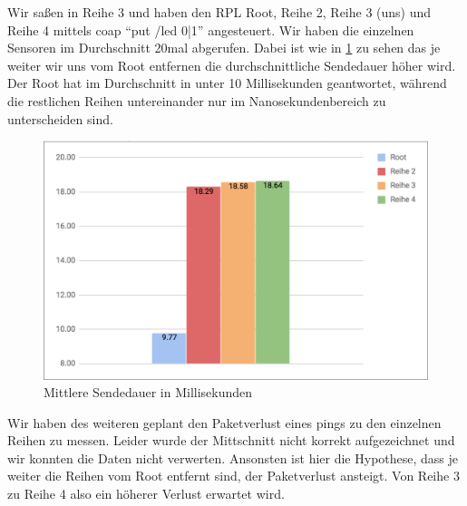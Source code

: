 \documentclass[paper=a4, fontsize=11pt]{scrartcl} %
\numberwithin{equation}{section} %
\numberwithin{figure}{section} %
\numberwithin{table}{section} %
\begin{document}
Wir saßen in Reihe 3 und haben den RPL Root, Reihe 2, Reihe 3 (uns) und Reihe 4 mittels coap ``put /led 0|1'' angesteuert. Wir haben die einzelnen Sensoren im Durchschnitt 20mal abgerufen. Dabei ist wie in \ref{fig:sendedauer} zu sehen das je weiter wir uns vom Root entfernen die durchschnittliche Sendedauer höher wird. Der Root hat im Durchschnitt in unter 10 Millisekunden geantwortet, während die restlichen Reihen untereinander nur im Nanosekundenbereich zu unterscheiden sind.

\begin{figure}[H]
  \centering
  \includegraphics[width=0.7\linewidth]{imgs/put-led-response-time.png}
  \caption{Mittlere Sendedauer in Millisekunden}
  \label{fig:sendedauer}
\end{figure}

Wir haben des weiteren geplant den Paketverlust eines pings zu den einzelnen Reihen zu messen. Leider wurde der Mittschnitt nicht korrekt aufgezeichnet und wir konnten die Daten nicht verwerten. Ansonsten ist hier die Hypothese, dass je weiter die Reihen vom Root entfernt sind, der Paketverlust ansteigt. Von Reihe 3 zu Reihe 4 also ein höherer Verlust erwartet wird.
\end{document}
